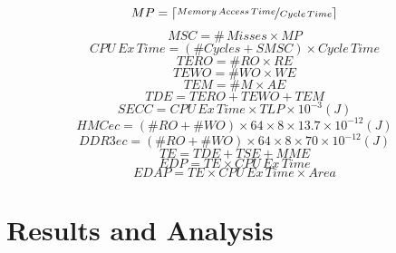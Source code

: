 \documentclass{sig-alternate-05-2015}
\begin{document}
{
	\begin{equation}
		MP=\lceil\nicefrac{Memory\,Access\,Time}{Cycle\,Time}\rceil\label{eq:MissPenalty}
	\end{equation}
	\begin{equation}
		MSC=\#\,Misses\times MP\label{eq:MSC}
	\end{equation}
	\begin{equation}
		CPU\,Ex\,Time=(\#Cycles+SMSC)\times Cycle\,Time\label{eq:CPUExTime}
	\end{equation}
	\begin{equation}
		TERO=\#RO\times RE\label{eq:TERO}
	\end{equation}
	\begin{equation}
		TEWO=\#WO\times WE\label{eq:TEWO}
	\end{equation}
	\begin{equation}
		TEM=\#M\times AE\label{eq:TEM}
	\end{equation}
	\begin{equation}
		TDE=TERO+TEWO+TEM\label{eq:TDE}
	\end{equation}
	\begin{equation}
		SECC=CPU\,Ex\,Time\times TLP\times10^{-3}(J)\label{eq:SECC}
	\end{equation}
	\begin{equation}
		HMCec=(\#RO+\#WO)\times64\times8\times13.7\times10^{-12}(J)\label{eq:HMCec}
	\end{equation}
	\begin{equation}
		DDR3ec=(\#RO+\#WO)\times64\times8\times70\times10^{-12}(J)\label{eq:DDR3ec}
	\end{equation}
	\begin{equation}
		TE=TDE+TSE+MME\label{eq:TE}
	\end{equation}
	\begin{equation}
	EDP=TE\times CPU\,Ex\,Time\label{eq:EDP}
	\end{equation}	
	\begin{equation}
	EDAP=TE\times CPU\,Ex\,Time\times Area\label{eq:EDAP}
	\end{equation}
}

\section{Results and Analysis} \label{sec:Results-and-Analysis}
\end{document}

